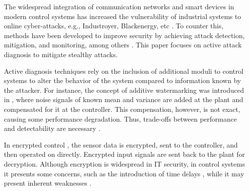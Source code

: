 % 
% 
The widespread integration of communication networks and smart devices in modern control systems has increased the vulnerability of industrial systems to online cyber-attacks, e.g., Industroyer, Blackenergy, etc \citep{osti_1505628}.
To counter this, methods have been developed to improve security by achieving attack detection, mitigation, and monitoring, among others \citep{sandberg2022secure}. This paper focuses on active attack diagnosis to mitigate stealthy attacks. 
%

Active diagnosis techniques rely on the inclusion of additional moduli to control systems
to alter the behavior of the system compared to information known by the attacker. 
For instance, the concept of additive watermarking was introduced in \cite{mo2015physical}, where noise signals of known mean and variance are added at the plant and compensated for it at the controller. 
This compensation, however, is not exact, causing some performance degradation. Thus, trade-offs between performance and detectability  are necessary \citep{zhu2023detection}.

In encrypted control \citep{darup2021encrypted}, the sensor data is encrypted, sent to the controller, and then operated on directly. Encrypted input signals are sent back to the plant for decryption. Although encryption is widespread in IT security, in control systems it presents some concerns, such as the introduction of time delays \citep{stabile2024verifiable}, while it may present inherent weaknesses \citep{alisic2023model}.

